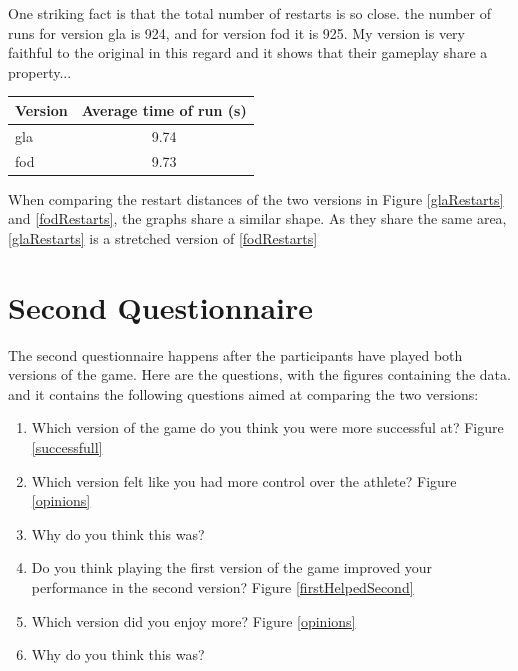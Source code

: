 \documentclass[12pt,a4paper,twoside,openright]{report}
\begin{document}
One striking fact is that the total number of restarts is so close. the number of runs for version gla is 924, and for version fod it is 925. My version is very faithful to the original in this regard and it shows that their gameplay share a property...


\begin{center}
\begin{tabular}{ |p{3cm}|c| }
  \hline
Version& Average time of run (s)\\ \hline
gla & 9.74 \\ \hline
fod & 9.73 \\ \hline
\end{tabular}
\end{center}


When comparing the restart distances of the two versions in Figure \ref{glaRestarts} and \ref{fodRestarts}, the graphs share a similar shape. As they share the same area, \ref{glaRestarts} is a stretched version of \ref{fodRestarts}




\section{Second Questionnaire}

The second questionnaire happens after the participants have played both versions of the game.
Here are the questions, with the figures containing the data.
and it contains the following questions aimed at comparing the two versions:

\begin{enumerate}
	\item Which version of the game do you think you were more successful at? Figure \ref{successfull}
	\item Which version felt like you had more control over the athlete? Figure \ref{opinions}
	\item Why do you think this was?
	\item Do you think playing the first version of the game improved your performance in the second version? Figure \ref{firstHelpedSecond}
	\item Which version did you enjoy more? Figure \ref{opinions}
	\item Why do you think this was?
\end{enumerate}
\end{document}
